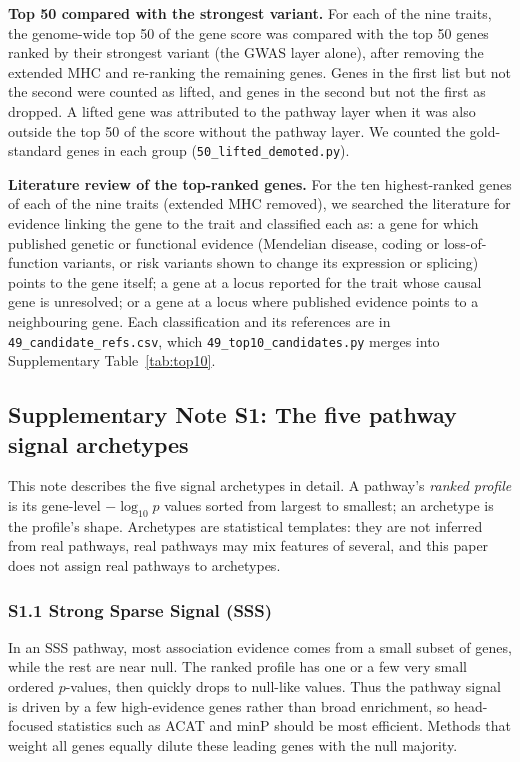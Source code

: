\textbf{Top 50 compared with the strongest variant.} For each of the nine traits, the genome-wide top 50 of the gene score was compared with the top 50 genes ranked by their strongest variant (the GWAS layer alone), after removing the extended MHC and re-ranking the remaining genes. Genes in the first list but not the second were counted as lifted, and genes in the second but not the first as dropped. A lifted gene was attributed to the pathway layer when it was also outside the top 50 of the score without the pathway layer. We counted the gold-standard genes in each group (\texttt{50\_lifted\_demoted.py}).

\textbf{Literature review of the top-ranked genes.} For the ten highest-ranked genes of each of the nine traits (extended MHC removed), we searched the literature for evidence linking the gene to the trait and classified each as: a gene for which published genetic or functional evidence (Mendelian disease, coding or loss-of-function variants, or risk variants shown to change its expression or splicing) points to the gene itself; a gene at a locus reported for the trait whose causal gene is unresolved; or a gene at a locus where published evidence points to a neighbouring gene. Each classification and its references are in \texttt{49\_candidate\_refs.csv}, which \texttt{49\_top10\_candidates.py} merges into Supplementary Table~\ref{tab:top10}.

\subsection*{Supplementary Note S1: The five pathway signal archetypes}

This note describes the five signal archetypes in detail. A pathway’s \emph{ranked profile} is its gene-level $-\log_{10}p$ values sorted from largest to smallest; an archetype is the profile’s shape. Archetypes are statistical templates: they are not inferred from real pathways, real pathways may mix features of several, and this paper does not assign real pathways to archetypes.

\subsubsection*{S1.1 Strong Sparse Signal (SSS)}

In an SSS pathway, most association evidence comes from a small subset of genes, while the rest are near null. The ranked profile has one or a few very small ordered $p$-values, then quickly drops to null-like values. Thus the pathway signal is driven by a few high-evidence genes rather than broad enrichment, so head-focused statistics such as ACAT and minP should be most efficient. Methods that weight all genes equally dilute these leading genes with the null majority.


